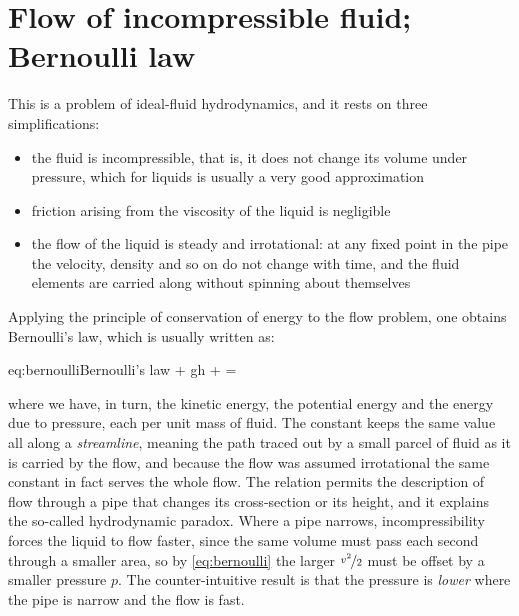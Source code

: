 \cleardoublepage
{}

\section{Flow of incompressible fluid; Bernoulli law}
\label{sec:bernoulli}

    This is a problem of ideal-fluid hydrodynamics, and it rests on three simplifications:

    \begin{itemize}
        \item the fluid is incompressible, that is, it does not change its volume under pressure, which for liquids is usually a very good approximation
        \item friction arising from the viscosity of the liquid is negligible
        \item the flow of the liquid is steady and irrotational: at any fixed point in the pipe the velocity, density and so on do not change with time, and the fluid elements are carried along without spinning about themselves
    \end{itemize}

    Applying the principle of conservation of energy to the flow problem, one obtains Bernoulli's law, which is usually written as:

    \begin{keyeq}{eq:bernoulli}{Bernoulli's law}
         + gh +  = \const
    \end{keyeq}

    where we have, in turn, the kinetic energy, the potential energy and the energy due to pressure, each per unit mass of fluid. The constant keeps the same value all along a \emph{streamline}, meaning the path traced out by a small parcel of fluid as it is carried by the flow, and because the flow was assumed irrotational the same constant in fact serves the whole flow. The relation permits the description of flow through a pipe that changes its cross-section or its height, and it explains the so-called hydrodynamic paradox. Where a pipe narrows, incompressibility forces the liquid to flow faster, since the same volume must pass each second through a smaller area, so by \cref{eq:bernoulli} the larger $\nicefrac{v^2}{2}$ must be offset by a smaller pressure $p$. The counter-intuitive result is that the pressure is \emph{lower} where the pipe is narrow and the flow is fast.

